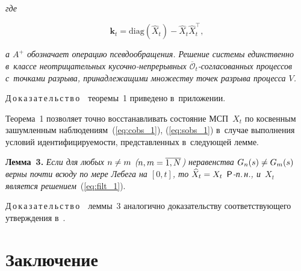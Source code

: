 \begin{multicols}{2}
     \vspace*{-6pt}
     
     \noindent
 \textit{где}
 
     \vspace*{-3pt}
     
     \noindent
 \begin{equation}
 \mathbf{k}_t = \mathrm{diag}\left(\widehat{X}_{t}\right)- \widehat{X}_{t} \widehat{X}_{t}^{\top},
 \label{eq:k_def}
 \end{equation}
 
     \vspace*{-2pt}
     
     \noindent
 \textit{а $A^+$ обозначает операцию псевдообращения.
Решение системы единственно в~классе неотрицательных кусочно-непрерывных $\overline{\mathcal{O}}_{t}$-согласованных процессов с~точками разрыва, принадлежащими множеству точек разрыва процесса $V$.
}

\noindent
 Д\,о\,к\,а\,з\,а\,т\,е\,л\,ь\,с\,т\,в\,о\ \ теоремы~1 приведено в~приложении.
 
 \vspace*{2pt}

  Теорема~1 позволяет точно восстанавливать состояние МСП~$X_t$ 
  по косвенным зашумленным наблюдениям~(\ref{eq:cobs_1}), (\ref{eq:sobs_1}) 
  в~случае выполнения условий идентифицируемости, представленных в~сле\-ду\-ющей лемме.
  
  \vspace*{2pt}
  
  \noindent
  \textbf{Лемма~3.}
\textit{Если для  любых $n\hm\neq m$ ($n,m\hm=\overline{1,N}$) неравенства 
$G_n(s) \hm\neq G_m(s)$ верны почти всюду по мере Лебега на $[0,t]$, то $\widehat{X}_t 
\hm= X_t$ ${\sf P}$-п.\,н., и~$X_t$ является решением}~(\ref{eq:filt_1}).

\vspace*{2pt}

\noindent
 Д\,о\,к\,а\,з\,а\,т\,е\,л\,ь\,с\,т\,в\,о\ \ леммы~3 
 аналогично доказательству соответствующего утверждения в~\cite{BS_20}.
 
 \vspace*{-6pt}

 \section{Заключение}
 
 \vspace*{-2pt}
 

\end{multicols}
